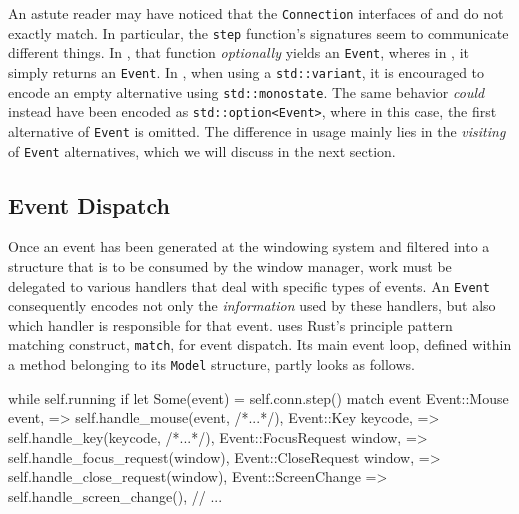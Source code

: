 
An  astute  reader may  have  noticed  that the  \texttt{Connection}  interfaces
of   \wmrs   and   \wmcpp   do   not   exactly   match.   In   particular,   the
\texttt{step}  function's  signatures  seem  to  communicate  different  things.
In   \wmrs,  that   function  \textit{optionally}   yields  an   \texttt{Event},
wheres  in  \wmcpp,   it  simply  returns  an  \texttt{Event}.   In  \cpp,  when
using   a   \texttt{std::variant},   it   is   encouraged   to   encode
an   empty   alternative  using   \texttt{std::monostate}\cite{cppstd}.
The   same    behavior   \textit{could}    instead   have   been    encoded   as
\texttt{std::option<Event>}, where in this  case, the first alternative
of  \texttt{Event} is  omitted.  The  difference in  usage  mainly  lies in  the
\textit{visiting} of \texttt{Event}  alternatives, which we will  discuss in the
next section.

\subsection{Event Dispatch}

Once an  event has been  generated at the windowing  system and filtered  into a
structure  that  is  to  be  consumed  by  the  window  manager,  work  must  be
delegated  to various  handlers  that deal  with specific  types  of events.  An
\texttt{Event} consequently  encodes not  only the \textit{information}  used by
these handlers, but also which handler is responsible for that event. \wmrs uses
Rust's principle pattern matching construct, \texttt{match}, for event
dispatch.  Its  main event  loop,  defined  within  a  method belonging  to  its
\texttt{Model} structure, partly looks as follows.

\begin{rustblock}
  while self.running {
    if let Some(event) = self.conn.step() {
      match event {
        Event::Mouse { event, }
          => self.handle_mouse(event, /*...*/),
        Event::Key { keycode, }
          => self.handle_key(keycode, /*...*/),
        Event::FocusRequest { window, }
          => self.handle_focus_request(window),
        Event::CloseRequest { window, }
          => self.handle_close_request(window),
        Event::ScreenChange
          => self.handle_screen_change(),
        // ...
      }
    }
  }
\end{rustblock}

